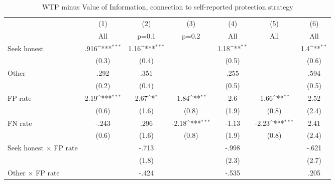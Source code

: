 \begin{table}[htbp]\centering
\def\sym#1{\ifmmode^{#1}\else\(^{#1}\)\fi}
\caption{WTP minus Value of Information, connection to self-reported protection strategy}
\begin{tabular}{l*{6}{c}}
\hline\hline
                &\multicolumn{1}{c}{(1)}&\multicolumn{1}{c}{(2)}&\multicolumn{1}{c}{(3)}&\multicolumn{1}{c}{(4)}&\multicolumn{1}{c}{(5)}&\multicolumn{1}{c}{(6)}\\
                &\multicolumn{1}{c}{All}&\multicolumn{1}{c}{p=0.1}&\multicolumn{1}{c}{p=0.2}&\multicolumn{1}{c}{All}&\multicolumn{1}{c}{All}&\multicolumn{1}{c}{All}\\
\hline
Seek honest     &     .916\sym{***}&     1.16\sym{***}&                  &     1.18\sym{**} &                  &      1.4\sym{**} \\
                &    (0.3)         &    (0.4)         &                  &    (0.5)         &                  &    (0.6)         \\
Other           &     .292         &     .351         &                  &     .255         &                  &     .594         \\
                &    (0.2)         &    (0.4)         &                  &    (0.5)         &                  &    (0.5)         \\
FP rate         &     2.19\sym{***}&     2.67\sym{*}  &    -1.84\sym{**} &      2.6         &    -1.66\sym{**} &     2.52         \\
                &    (0.6)         &    (1.6)         &    (0.8)         &    (1.9)         &    (0.8)         &    (2.4)         \\
FN rate         &    -.243         &     .296         &    -2.18\sym{***}&    -1.13         &    -2.23\sym{***}&     2.41         \\
                &    (0.6)         &    (1.6)         &    (0.8)         &    (1.9)         &    (0.8)         &    (2.4)         \\
Seek honest $\times$ FP rate&                  &    -.713         &                  &    -.998         &                  &    -.621         \\
                &                  &    (1.8)         &                  &    (2.3)         &                  &    (2.7)         \\
Other $\times$ FP rate&                  &    -.424         &                  &    -.535         &                  &     .205         \\

\end{tabular}
\end{table}
